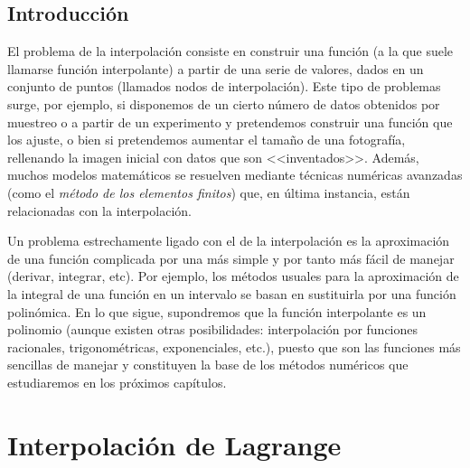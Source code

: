 
\subsection*{Introducción}

El problema de la interpolación consiste en construir una función (a
la que suele llamarse función interpolante) a partir de una serie de
valores, dados en un conjunto de puntos (llamados nodos de
interpolación).  Este tipo de problemas surge, por ejemplo, si
disponemos de un cierto número de datos obtenidos por muestreo o a
partir de un experimento y pretendemos construir una función que los
ajuste, o bien si pretendemos aumentar el tamaño de una fotografía,
rellenando la imagen inicial con datos que son <<inventados>>. Además,
muchos modelos matemáticos se resuelven mediante técnicas numéricas
avanzadas (como el \textit{método de los elementos finitos}) que, en
última instancia, están relacionadas con la interpolación.

Un problema estrechamente ligado con el de la interpolación es la
aproximación de una función complicada por una más simple y por tanto
más fácil de manejar (derivar, integrar, etc). Por ejemplo, los
métodos usuales para la aproximación de la integral de una función en
un intervalo se basan en sustituirla por una función polinómica.  En
lo que sigue, supondremos que la función interpolante es un polinomio
(aunque existen otras posibilidades: interpolación por funciones
racionales, trigonométricas, exponenciales, etc.), puesto que son las
funciones más sencillas de manejar y constituyen la base de los
métodos numéricos que estudiaremos en los próximos capítulos.

\section{Interpolación de Lagrange}
\label{sec:interp-de-lagrange}

